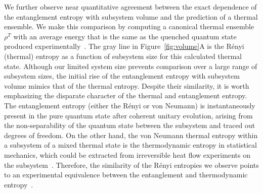 We further observe near quantitative agreement between the exact dependence of the entanglement entropy with subsystem volume and the prediction of a thermal ensemble. We make this comparison by computing a canonical thermal ensemble $\rho^T$ with an average energy that is the same as the quenched quantum state produced experimentally~\cite{Grover2015}. The gray line in Figure~\ref{fig:volume}A is the R\'{e}nyi (thermal) entropy as a function of subsystem size for this calculated thermal state. Although our limited system size prevents comparison over a large range of subsystem sizes, the initial rise of the entanglement entropy with subsystem volume mimics that of the thermal entropy. Despite their similarity, it is worth emphasizing the disparate character of the thermal and entanglement entropy. The entanglement entropy (either the R\'{e}nyi or von Neumann) is instantaneously present in the pure quantum state after coherent unitary evolution, arising from the non-separability of the quantum state between the subsystem and traced out degrees of freedom. On the other hand, the von Neumann thermal entropy within a subsystem of a mixed thermal state is the thermodynamic entropy in statistical mechanics, which could be extracted from irreversible heat flow experiments on the subsystem~\cite{Deutsch2013}. Therefore, the similarity of the R\'{e}nyi  entropies we observe points to an experimental equivalence between the entanglement and thermodynamic entropy~\cite{Grover2014,Grover2015}.

